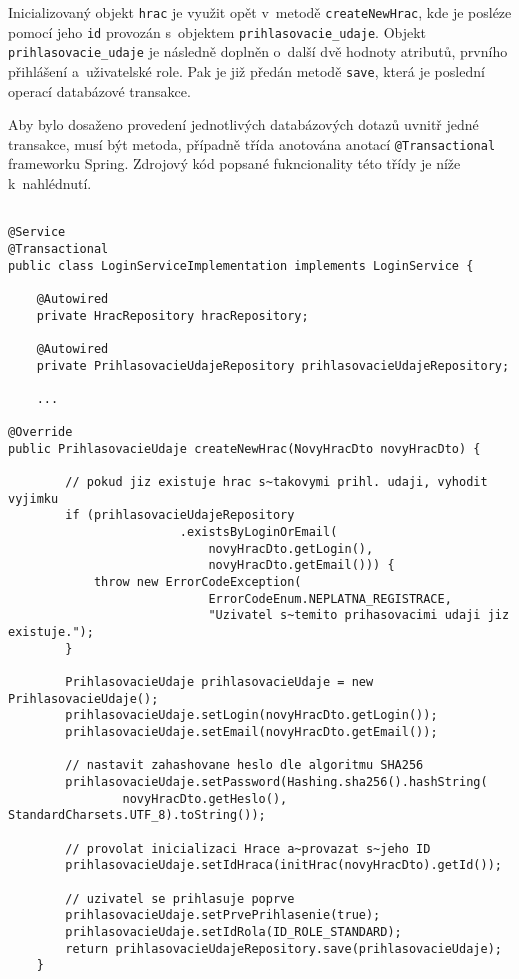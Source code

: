 \documentclass[twoside, 12pt]{article}
\begin{document}
{Inicializovaný objekt \texttt{hrac} je využit opět v~metodě \texttt{createNewHrac},
kde je posléze pomocí jeho \texttt{id} provozán s~objektem \texttt{prihlasovacie\_udaje}.
Objekt \texttt{prihlasovacie\_udaje} je následně doplněn o~další dvě hodnoty atributů, prvního přihlášení a~uživatelské role.
Pak je již předán metodě \texttt{save}, která je poslední operací databázové transakce.

Aby bylo dosaženo provedení jednotlivých databázových dotazů uvnitř jedné transakce,
musí být metoda, případně třída anotována anotací \texttt{@Transactional}
frameworku Spring. Zdrojový kód popsané fukncionality této třídy je níže k~nahlédnutí.


\clearpage

\begin{lstlisting}

@Service
@Transactional
public class LoginServiceImplementation implements LoginService {

    @Autowired
    private HracRepository hracRepository;

    @Autowired
    private PrihlasovacieUdajeRepository prihlasovacieUdajeRepository;

    ...

@Override
public PrihlasovacieUdaje createNewHrac(NovyHracDto novyHracDto) {

        // pokud jiz existuje hrac s~takovymi prihl. udaji, vyhodit vyjimku
        if (prihlasovacieUdajeRepository
                        .existsByLoginOrEmail(
                            novyHracDto.getLogin(),
                            novyHracDto.getEmail())) {
            throw new ErrorCodeException(
                            ErrorCodeEnum.NEPLATNA_REGISTRACE,
                            "Uzivatel s~temito prihasovacimi udaji jiz existuje.");
        }

        PrihlasovacieUdaje prihlasovacieUdaje = new PrihlasovacieUdaje();
        prihlasovacieUdaje.setLogin(novyHracDto.getLogin());
        prihlasovacieUdaje.setEmail(novyHracDto.getEmail());

        // nastavit zahashovane heslo dle algoritmu SHA256
        prihlasovacieUdaje.setPassword(Hashing.sha256().hashString(
                novyHracDto.getHeslo(), StandardCharsets.UTF_8).toString());

        // provolat inicializaci Hrace a~provazat s~jeho ID
        prihlasovacieUdaje.setIdHraca(initHrac(novyHracDto).getId());

        // uzivatel se prihlasuje poprve
        prihlasovacieUdaje.setPrvePrihlasenie(true);
        prihlasovacieUdaje.setIdRola(ID_ROLE_STANDARD);
        return prihlasovacieUdajeRepository.save(prihlasovacieUdaje);
    }


\end{lstlisting}}
\end{document}

